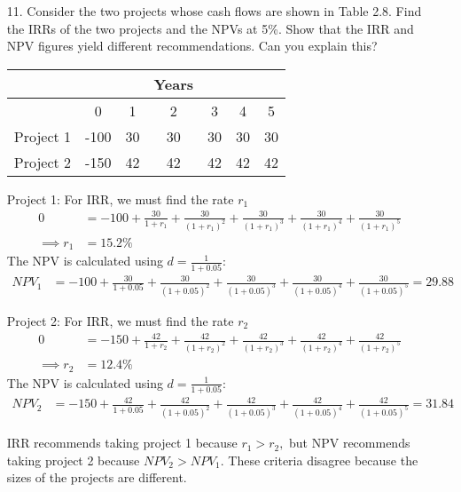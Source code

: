 \documentclass{article}
\begin{document}
\begin{itemize}
	\item[11.] Consider the two projects whose cash flows are shown in Table 2.8. Find the IRRs of the two projects and the NPVs at 5\%. Show that the IRR and NPV figures yield different recommendations. Can you explain this?
		\begin{center}
			\begin{tabular}{lcccccc}
				& & & Years & & & \\
				\hline
				& 0 & 1 & 2 & 3 & 4 & 5 \\
				\hline
				Project 1 & -100 & 30 & 30 & 30 & 30 & 30 \\
				Project 2 & -150 & 42 & 42 & 42 & 42 & 42 \\
				\hline
			\end{tabular}
		\end{center}
		\begin{soln}
			Project 1: For IRR, we must find the rate $r_1$
			\begin{align*}
				0 &= -100 + \frac{30}{1+r_1} + \frac{30}{(1+r_1)^2} + \frac{30}{(1+r_1)^3} + \frac{30}{(1+r_1)^4} + \frac{30}{(1+r_1)^5} \\
				\implies r_1 &= 15.2\%
			\end{align*}
			The NPV is calculated using $d=\frac{1}{1+0.05}:$
			\begin{align*}
				NPV_1 &= -100 + \frac{30}{1+0.05} + \frac{30}{(1+0.05)^2} + \frac{30}{(1+0.05)^3} + \frac{30}{(1+0.05)^4} + \frac{30}{(1+0.05)^5} = 29.88
			\end{align*}

			Project 2: For IRR, we must find the rate $r_2$ 
			\begin{align*}
				0 &= -150 + \frac{42}{1+r_2} + \frac{42}{(1+r_2)^2} + \frac{42}{(1+r_2)^3} + \frac{42}{(1+r_2)^4} + \frac{42}{(1+r_2)^5} \\
				\implies r_2 &= 12.4\%
			\end{align*}
			The NPV is calculated using $d=\frac{1}{1+0.05}:$
			\begin{align*}
				NPV_2 &= -150 + \frac{42}{1+0.05} + \frac{42}{(1+0.05)^2} + \frac{42}{(1+0.05)^3} + \frac{42}{(1+0.05)^4} + \frac{42}{(1+0.05)^5} = 31.84
			\end{align*}

			IRR recommends taking project 1 because $r_1>r_2,$ but NPV recommends taking project 2 because $NPV_2>NPV_1.$ These criteria disagree because the sizes of the projects are different. 
		\end{soln}


\end{itemize}
\end{document}
